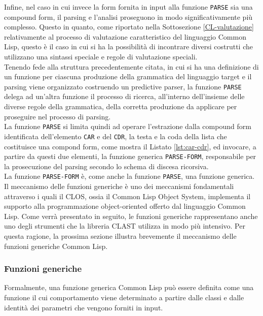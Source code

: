 Infine, nel caso in cui invece la form fornita in input alla funzione
\texttt{PARSE} sia una compound form, il parsing e l’analisi proseguono in modo
significativamente più complesso. Questo in quanto, come riportato nella
Sottosezione \ref{CL-valutazione} relativamente al processo di valutazione
caratteristico del linguaggio Common Lisp, questo è il caso in cui si ha la
possibilità di incontrare diversi costrutti che utilizzano una sintassi speciale
e regole di valutazione speciali.\\

Tenendo fede alla struttura precedentemente citata, in cui si ha una
definizione di un funzione per ciascuna produzione della grammatica del
linguaggio target e il parsing viene organizzato costruendo un predictive
parser, la funzione \texttt{PARSE} delega ad un’altra funzione il processo di
ricerca, all’interno dell’insieme delle diverse regole della grammatica, della
corretta produzione da applicare per proseguire nel processo di parsing.\\

La funzione \texttt{PARSE} si limita quindi ad operare l'estrazione dalla
compound form identificata dell’elemento \texttt{CAR} e del \texttt{CDR}, la
testa e la coda della lista che costituisce una compond form, come mostra il
Listato \ref{lst:car-cdr}, ed invocare, a partire da questi due elementi, la
funzione generica \texttt{PARSE-FORM}, responsabile per la prosecuzione del
parsing secondo lo schema di discesa ricorsiva.\\

La funzione \texttt{PARSE-FORM} è, come anche la funzione \texttt{PARSE}, una
funzione generica. Il meccanismo delle funzioni generiche è uno dei meccanismi
fondamentali attraverso i quali il CLOS, ossia il Common Lisp Object System,
implementa il supporto alla programmazione object-oriented offerto dal
linguaggio Common Lisp. Come verrà presentato in seguito, le funzioni
generiche rappresentano anche uno degli strumenti che la libreria CLAST
utilizza in modo più intensivo. Per questa ragione, la prossima sezione
illustra brevemente il meccanismo delle funzioni generiche Common Lisp.

\subsubsection{Funzioni generiche}

Formalmente, una funzione generica Common Lisp può essere definita come una
funzione il cui comportamento viene determinato a partire dalle classi e dalle
identità dei parametri che vengono forniti in input.\\

